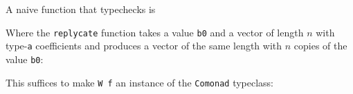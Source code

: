 \documentclass{amsart}
\begin{document}


A naive function that typechecks is



Where the \texttt{replycate} function takes a value \texttt{b0} and a
vector of length $n$ with type-\texttt{a} coefficients and produces a vector
of the same length with $n$ copies of the value \texttt{b0}:



This suffices to make \texttt{W f} an instance of the
\texttt{Comonad} typeclass:


\end{document}
